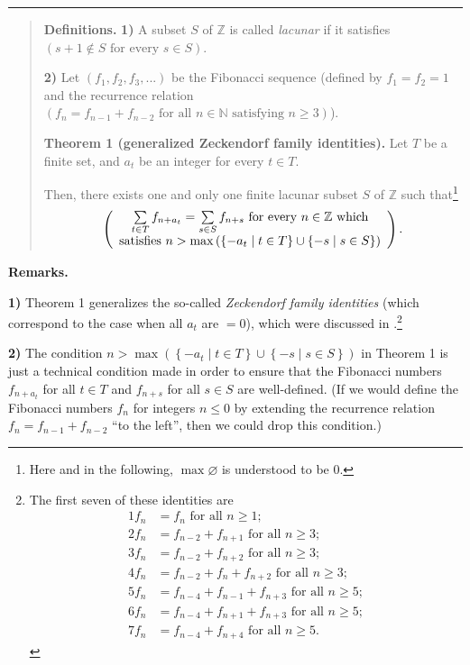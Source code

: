 \documentclass[numbers=enddot,12pt,final,onecolumn,notitlepage]{scrartcl}%
\numberwithin{exer}{section}
\theoremstyle{definition}
\let\sumnonlimits\sum
\renewcommand{\sum}{\sumnonlimits\limits}
\begin{document}
\hrule


\begin{quote}
\textbf{Definitions.} \textbf{1)} A subset $S$ of $\mathbb{Z}$ is called
\textit{lacunar} if it satisfies $\left(  s+1\notin S\text{ for every }s\in
S\right)  $.

\textbf{2)} Let $\left(  f_{1},f_{2},f_{3},...\right)  $ be the Fibonacci
sequence (defined by $f_{1}=f_{2}=1$ and the recurrence relation $\left(
f_{n}=f_{n-1}+f_{n-2}\text{ for all }n\in\mathbb{N}\text{ satisfying }%
n\geq3\right)  $).

\textbf{Theorem 1 (generalized Zeckendorf family identities).} Let $T$ be a
finite set, and $a_{t}$ be an integer for every $t\in T$.

Then, there exists one and only one finite lacunar subset $S$ of $\mathbb{Z}$
such that\footnote{Here and in the following, $\max\varnothing$ is understood
to be $0$.}
\[
\left(
\begin{array}
[c]{c}%
\sum\limits_{t\in T}f_{n+a_{t}}=\sum\limits_{s\in S}f_{n+s}\text{ for every
}n\in\mathbb{Z}\text{ which}\\
\text{satisfies }n>\max\left(  \left\{  -a_{t}\mid t\in T\right\}
\cup\left\{  -s\mid s\in S\right\}  \right)
\end{array}
\right)  .
\]



\end{quote}

\textbf{Remarks.}

\textbf{1)} Theorem 1 generalizes the so-called \textit{Zeckendorf family
identities} (which correspond to the case when all $a_{t}$ are $=0$), which
were discussed in \cite{1}.\footnote{The first seven of these identities are%
\begin{align*}
1f_{n}  &  =f_{n}\text{ for all }n\geq1;\\
2f_{n}  &  =f_{n-2}+f_{n+1}\text{ for all }n\geq3;\\
3f_{n}  &  =f_{n-2}+f_{n+2}\text{ for all }n\geq3;\\
4f_{n}  &  =f_{n-2}+f_{n}+f_{n+2}\text{ for all }n\geq3;\\
5f_{n}  &  =f_{n-4}+f_{n-1}+f_{n+3}\text{ for all }n\geq5;\\
6f_{n}  &  =f_{n-4}+f_{n+1}+f_{n+3}\text{ for all }n\geq5;\\
7f_{n}  &  =f_{n-4}+f_{n+4}\text{ for all }n\geq5.
\end{align*}
}

\textbf{2)} The condition $n>\max\left(  \left\{  -a_{t}\mid t\in T\right\}
\cup\left\{  -s\mid s\in S\right\}  \right)  $ in Theorem 1 is just a
technical condition made in order to ensure that the Fibonacci numbers
$f_{n+a_{t}}$ for all $t\in T$ and $f_{n+s}$ for all $s\in S$ are
well-defined. (If we would define the Fibonacci numbers $f_{n}$ for integers
$n\leq0$ by extending the recurrence relation $f_{n}=f_{n-1}+f_{n-2}$ ``to the
left'', then we could drop this condition.)
\end{document}
